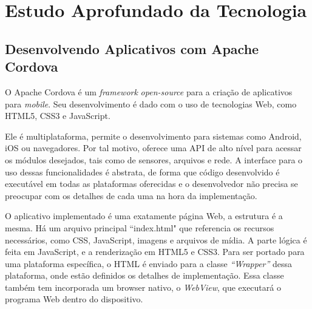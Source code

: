 \documentclass[a4paper,12pt]{article}
\begin{document}
%
%








\newpage

\section{Estudo Aprofundado da Tecnologia}

\subsection{Desenvolvendo Aplicativos com Apache Cordova}



O Apache Cordova é um \emph{framework} \emph{open-source} para a criação de aplicativos para \emph{mobile}. Seu desenvolvimento é dado com o uso de tecnologias Web, como HTML5, CSS3 e JavaScript.

Ele é multiplataforma, permite o desenvolvimento para sistemas como Android, iOS ou navegadores. Por tal motivo, oferece uma API de alto nível para acessar os módulos desejados, tais como de sensores, arquivos e rede. A interface para o uso dessas funcionalidades é abstrata, de forma que código desenvolvido é executável em todas as plataformas oferecidas e o desenvolvedor não precisa se preocupar com os detalhes de cada uma na hora da implementação.

O aplicativo implementado é uma exatamente página Web, a estrutura é a mesma. Há um arquivo principal “index.html" que referencia os recursos necessários, como CSS, JavaScript, imagens e arquivos de mídia. A parte lógica é feita em JavaScript, e a renderização em HTML5 e CSS3. Para ser portado para uma plataforma específica, o HTML é enviado para a classe \emph{“Wrapper”} dessa plataforma, onde estão definidos os detalhes de implementação. Essa classe também tem incorporada um browser nativo, o \emph{WebView}, que executará o programa Web dentro do dispositivo.
\end{document}
